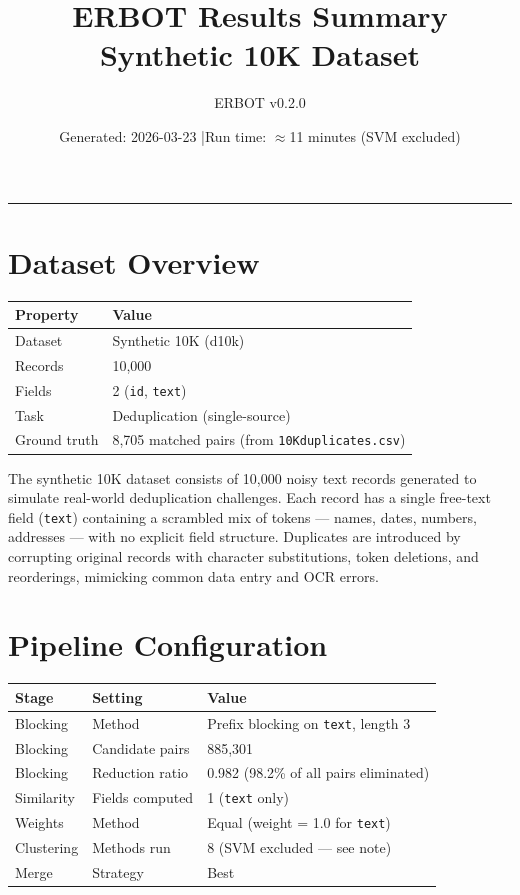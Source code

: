 \documentclass[11pt, a4paper]{article}
\title{\textbf{ERBOT Results Summary}\\[4pt]
       \large Synthetic 10K Dataset}
\author{ERBOT v0.2.0}
\date{Generated: 2026-03-23 \quad|\quad Run time: $\approx$11 minutes (SVM excluded)}
\begin{document}
\maketitle
\tableofcontents
\vspace{1em}
\hrule
\vspace{1em}

\section{Dataset Overview}

\begin{table}[h!]
\centering
\begin{tabular}{ll}
\toprule
\textbf{Property} & \textbf{Value} \\
\midrule
Dataset      & Synthetic 10K (d10k) \\
Records      & 10,000 \\
Fields       & 2 (\texttt{id}, \texttt{text}) \\
Task         & Deduplication (single-source) \\
Ground truth & 8,705 matched pairs (from \texttt{10Kduplicates.csv}) \\
\bottomrule
\end{tabular}
\end{table}

The synthetic 10K dataset consists of 10,000 noisy text records generated to simulate
real-world deduplication challenges. Each record has a single free-text field
(\texttt{text}) containing a scrambled mix of tokens --- names, dates, numbers,
addresses --- with no explicit field structure. Duplicates are introduced by corrupting
original records with character substitutions, token deletions, and reorderings,
mimicking common data entry and OCR errors.

\section{Pipeline Configuration}

\begin{table}[h!]
\centering
\begin{tabular}{lll}
\toprule
\textbf{Stage} & \textbf{Setting} & \textbf{Value} \\
\midrule
Blocking   & Method          & Prefix blocking on \texttt{text}, length 3 \\
Blocking   & Candidate pairs & 885,301 \\
Blocking   & Reduction ratio & 0.982 (98.2\% of all pairs eliminated) \\
Similarity & Fields computed & 1 (\texttt{text} only) \\
Weights    & Method          & Equal (weight = 1.0 for \texttt{text}) \\
Clustering & Methods run     & 8 (SVM excluded --- see note) \\
Merge      & Strategy        & Best \\
\bottomrule
\end{tabular}
\end{table}
\end{document}
